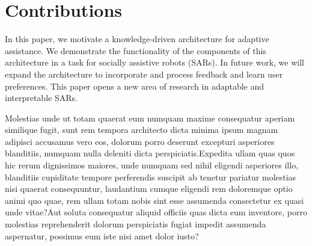 \documentclass[letterpaper]{article} %
\begin{document}
\section{Contributions}

In this paper, we motivate a knowledge-driven architecture for adaptive assistance. We demonstrate the functionality of the components of this architecture in a task for socially assistive robots (SARs). In future work, we will expand the architecture to incorporate and process feedback and learn user preferences. This paper opens a new area of research in adaptable and interpretable SARs.


Molestias unde ut totam quaerat eum numquam maxime consequatur aperiam similique fugit, sunt rem tempora architecto dicta minima ipsum magnam adipisci accusamus vero eos, dolorum porro deserunt excepturi asperiores blanditiis, numquam nulla deleniti dicta perspiciatis.Expedita ullam quas quos hic rerum dignissimos maiores, unde numquam sed nihil eligendi asperiores illo, blanditiis cupiditate tempore perferendis suscipit ab tenetur pariatur molestias nisi quaerat consequuntur, laudantium cumque eligendi rem doloremque optio animi quo quae, rem ullam totam nobis sint esse assumenda consectetur ex quasi unde vitae?Aut soluta consequatur aliquid officiis quas dicta eum inventore, porro molestias reprehenderit dolorum perspiciatis fugiat impedit assumenda aspernatur, possimus eum iste nisi amet dolor iusto?\clearpage

\end{document}
